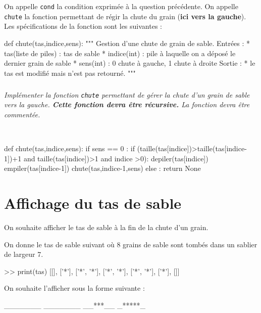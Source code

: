\documentclass[10pt,fleqn]{article} %
\begin{document}
\vspace{.25cm}

On appelle \texttt{cond} la condition exprimée à la question précédente.
On appelle \texttt{chute} la fonction permettant de régir la chute du grain (\textbf{ici vers la gauche}). Les spécifications de la fonction sont les suivantes : 
\begin{py}
\begin{python}
def chute(tas,indice,sens):
    """
    Gestion d'une chute de grain de sable.
    Entrées : 
     * tas(liste de piles) : tas de sable
     * indice(int) : pile à laquelle on a déposé le dernier grain de sable
     * sens(int) : 0 chute à gauche, 1 chute à droite
    Sortie : 
     * le tas est modifié mais n'est pas retourné.
    """
\end{python}
\end{py}

\subparagraph{}
\textit{Implémenter la fonction \texttt{chute} permettant de gérer la chute d'un grain de sable vers la gauche. \textbf{Cette fonction devra être récursive.} La fonction devra être commentée.}
\ifprof
\begin{corrige}
~\\
\begin{python}
def chute(tas,indice,sens):
    if sens == 0 :
        if (taille(tas[indice])>taille(tas[indice-1])+1 and taille(tas[indice])>1 and indice >0):
            depiler(tas[indice])
            empiler(tas[indice-1])
            chute(tas,indice-1,sens)
        else :
            return None
\end{python}
\end{corrige}
\else
\fi

\section{Affichage du tas de sable}
\ifprof
\else
On souhaite afficher le tas de sable à la fin de la chute d'un grain. 

\begin{minipage}[t]{.47\linewidth}
On donne le tas de sable suivant où 8 grains de sable sont tombés dans un sablier de largeur 7.  
\begin{py}
\begin{python}
>> print(tas)
    [[], ['*'], ['*', '*'], ['*', '*'], 
    ['*', '*'], ['*'], []]
\end{python}
\end{py}
\end{minipage} \hfill
\begin{minipage}[t]{.47\linewidth}
On souhaite l'afficher sous la forme suivante : 
\begin{py}
\begin{python}
_______
_______
__***__
_*****_
\end{python}
\end{py}
\end{minipage} 
\fi
\end{document}
